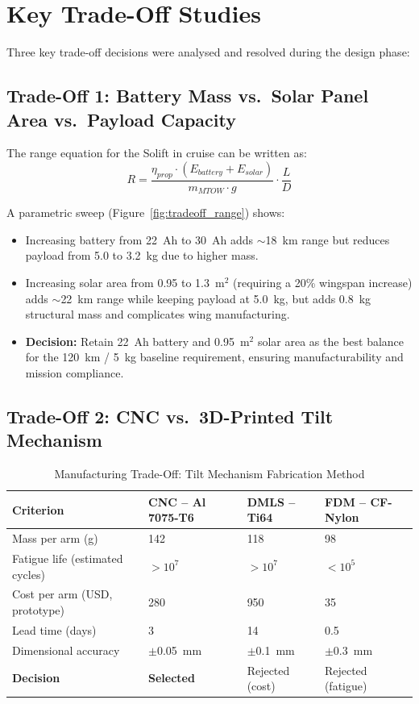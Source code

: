 \section{Key Trade-Off Studies}

Three key trade-off decisions were analysed and resolved during the design phase:

\subsection{Trade-Off 1: Battery Mass vs.\ Solar Panel Area vs.\ Payload Capacity}

The range equation for the Solift in cruise can be written as:
\begin{equation}
    R = \frac{\eta_{prop} \cdot (E_{battery} + E_{solar})}{m_{MTOW} \cdot g} \cdot \frac{L}{D}
    \label{eq:range}
\end{equation}

A parametric sweep (Figure~\ref{fig:tradeoff_range}) shows:
\begin{itemize}[noitemsep]
    \item Increasing battery from 22~Ah to 30~Ah adds $\sim$18~km range but reduces payload from 5.0 to 3.2~kg due to higher mass.
    \item Increasing solar area from 0.95 to 1.3~m$^2$ (requiring a 20\% wingspan increase) adds $\sim$22~km range while keeping payload at 5.0~kg, but adds 0.8~kg structural mass and complicates wing manufacturing.
    \item \textbf{Decision:} Retain 22~Ah battery and 0.95~m$^2$ solar area as the best balance for the 120~km / 5~kg baseline requirement, ensuring manufacturability and mission compliance.
\end{itemize}

\subsection{Trade-Off 2: CNC vs.\ 3D-Printed Tilt Mechanism}

\begin{table}[H]
\centering
\caption{Manufacturing Trade-Off: Tilt Mechanism Fabrication Method}
\label{tab:tradeoff_mfg}
\begin{tabularx}{\textwidth}{L{4.5cm} C{3cm} C{3cm} C{3cm}}
\toprule
\textbf{Criterion} & \textbf{CNC -- Al 7075-T6} & \textbf{DMLS -- Ti64} & \textbf{FDM -- CF-Nylon} \\
\midrule
Mass per arm (g) & 142 & 118 & 98 \\
Fatigue life (estimated cycles) & $> 10^7$ & $> 10^7$ & $< 10^5$ \\
Cost per arm (USD, prototype) & 280 & 950 & 35 \\
Lead time (days) & 3 & 14 & 0.5 \\
Dimensional accuracy & $\pm$0.05~mm & $\pm$0.1~mm & $\pm$0.3~mm \\
\textbf{Decision} & \textbf{Selected} & Rejected (cost) & Rejected (fatigue) \\
\bottomrule
\end{tabularx}
\end{table}

